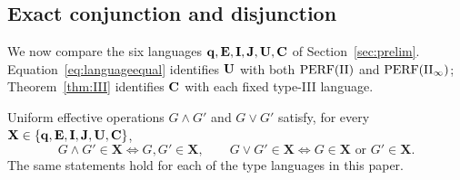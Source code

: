\subsection{Exact conjunction and disjunction}
We now compare the six languages $\mathbf q,\mathbf E,\mathbf I,\mathbf J,\mathbf U,\mathbf C$ of Section~\ref{sec:prelim}. Equation~\eqref{eq:languageequal} identifies $\mathbf U$ with both $\mathrm{PERF}(\mathrm{II})$ and $\mathrm{PERF}(\mathrm{II}_\infty)$; Theorem~\ref{thm:III} identifies $\mathbf C$ with each fixed type-III language.
\begin{backgroundlemma}
Uniform effective operations $G\wedge G'$ and $G\vee G'$ satisfy, for every $\mathbf X\in\{\mathbf q,\mathbf E,\mathbf I,\mathbf J,\mathbf U,\mathbf C\}$,
\[
 G\wedge G'\in\mathbf X\iff G,G'\in\mathbf X,\qquad
 G\vee G'\in\mathbf X\iff G\in\mathbf X\text{ or }G'\in\mathbf X.
\]
The same statements hold for each of the type languages in this paper.
\end{backgroundlemma}

